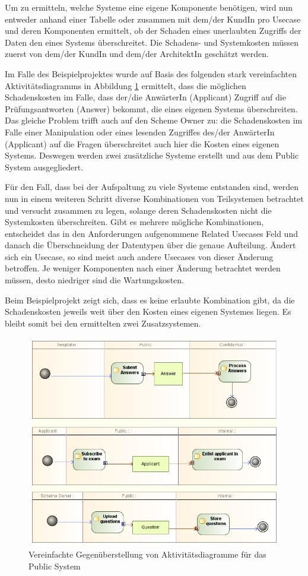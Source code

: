 Um zu ermitteln, welche Systeme eine eigene Komponente benötigen, wird nun entweder anhand einer Tabelle oder zusammen mit dem/der KundIn pro Usecase und deren Komponenten ermittelt, ob der Schaden eines unerlaubten Zugriffs der Daten den eines Systems überschreitet. Die Schadens- und Systemkosten müssen zuerst von dem/der KundIn und dem/der ArchitektIn geschätzt werden.

Im Falle des Beispielprojektes wurde auf Basis des folgenden stark vereinfachten Aktivitätsdiagramms in Abbildung \ref{fig:actorarch} ermittelt, dass die möglichen Schadenskosten im Falle, dass der/die AnwärterIn (Applicant) Zugriff auf die Prüfungsantworten (Answer) bekommt, die eines eigenen Systems überschreiten. Das gleiche Problem trifft auch auf den Scheme Owner zu: die Schadenskosten im Falle einer Manipulation oder eines lesenden Zugriffes des/der AnwärterIn (Applicant) auf die Fragen überschreitet auch hier die Kosten eines eigenen Systems. Deswegen werden zwei zusätzliche Systeme erstellt und aus dem Public System ausgegliedert.

Für den Fall, dass bei der Aufspaltung zu viele Systeme entstanden sind, werden nun in einem weiteren Schritt diverse Kombinationen von Teilsystemen betrachtet und versucht zusammen zu legen, solange deren Schadenskosten nicht die Systemkosten überschreiten. Gibt es mehrere mögliche Kombinationen, entscheidet das in den Anforderungen aufgenommene Related Usecases Feld und danach die Überschneidung der Datentypen über die genaue Aufteilung. Ändert sich ein Usecase, so sind meist auch andere Usecases von dieser Änderung betroffen. Je weniger Komponenten nach einer Änderung betrachtet werden müssen, desto niedriger sind die Wartungskosten.

Beim Beispielprojekt zeigt sich, dass es keine erlaubte Kombination gibt, da die Schadenskosten jeweils weit über den Kosten eines eigenen Systemes liegen. Es bleibt somit bei den ermittelten zwei Zusatzsystemen.

\begin{figure}[H]
    \centering
    \includegraphics[scale=0.6]{uml/actorarch.png}
    \caption{Vereinfachte Gegenüberstellung von Aktivitätsdiagramme für das Public System}
    \label{fig:actorarch}
\end{figure}

